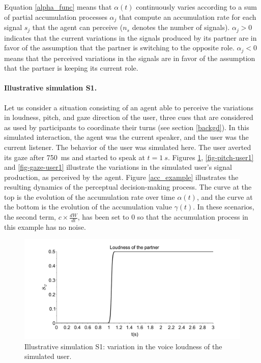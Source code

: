 \documentclass[twocolumn]{svjour3}
\begin{document}
Equation \ref{alpha_func} means that $\alpha(t)$ continuously varies according to a sum of partial accumulation processes $\alpha_{j}$ that compute an accumulation rate for each signal $s_j$ that the agent can perceive ($n_s$ denotes the number of signals). %
$\alpha_{j}>0$ indicates that the current variations in the signals produced by its partner are in favor of the assumption that the partner is switching to  the opposite role.
$\alpha_{j}<0$  means that the perceived variations in the signals are in favor of the assumption that the partner is keeping its current role. 

\paragraph{Illustrative simulation S1.}
Let us consider a situation consisting of an agent able to perceive the variations in loudness, pitch, and gaze direction of the user, three cues that are considered as used by participants to coordinate their turns (see section \ref{backgd}). 
In this simulated interaction, the agent was the current speaker, and the user was the current listener. The behavior of the user was simulated here.
The user averted its gaze after 750~ms and started to speak at $t=1~s$.
Figures \ref{fig-volume-user1}, \ref{fig-pitch-user1} and \ref{fig-gaze-user1} illustrate the variations in the simulated user's signal production, as perceived by the agent. 
Figure \ref{acc_example} illustrates the resulting dynamics of the perceptual decision-making process. 
The curve at the top is the evolution of the accumulation rate over time $\alpha(t)$, and the curve at the bottom is the evolution of the accumulation value $\gamma(t)$. In these scenarios, the second term, $c \times \frac{dW}{dt}$, has been set to 0 so that the accumulation process in this example has no noise. 

\begin{figure}
  \centering
  \includegraphics[width=\linewidth]{figure/loudness_simulated_partner.pdf}
  \caption{Illustrative simulation S1: variation in the voice loudness of the simulated user.}
  \label{fig-volume-user1}
\end{figure}
\end{document}
